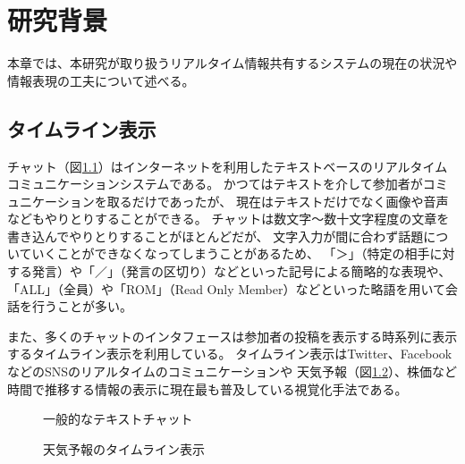 \chapter{研究背景}
\label{chap:background}

本章では、本研究が取り扱うリアルタイム情報共有するシステムの現在の状況や情報表現の工夫について述べる。

\newpage

\section{タイムライン表示}

チャット（図\ref{chat}）はインターネットを利用したテキストベースのリアルタイムコミュニケーションシステムである。
かつてはテキストを介して参加者がコミュニケーションを取るだけであったが、
現在はテキストだけでなく画像や音声などもやりとりすることができる。
チャットは数文字〜数十文字程度の文章を書き込んでやりとりすることがほとんどだが、
文字入力が間に合わず話題についていくことができなくなってしまうことがあるため、
「＞」（特定の相手に対する発言）や「／」（発言の区切り）などといった記号による簡略的な表現や、
「ALL」（全員）や「ROM」（Read Only Member）などといった略語を用いて会話を行うことが多い。

また、多くのチャットのインタフェースは参加者の投稿を表示する時系列に表示するタイムライン表示を利用している。
タイムライン表示はTwitter、FacebookなどのSNSのリアルタイムのコミュニケーションや
天気予報（図\ref{weather}）、株価など時間で推移する情報の表示に現在最も普及している視覚化手法である。

\begin{figure}[H]
\centering
{}
\caption{一般的なテキストチャット}
\label{chat}
\end{figure}

\begin{figure}[H]
\centering
{}
\caption{天気予報のタイムライン表示}
\label{weather}
\end{figure}

